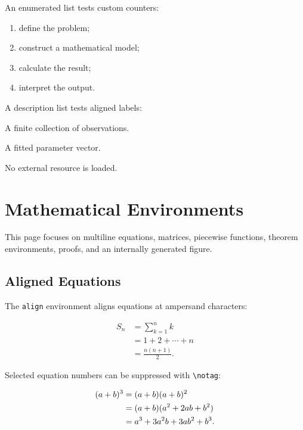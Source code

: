 \documentclass[10pt,a4paper,twocolumn]{article}
\theoremstyle{definition}
\theoremstyle{remark}
\begin{document}
An enumerated list tests custom counters:

\begin{enumerate}[label=(\roman*)]
  \item define the problem;
  \item construct a mathematical model;
  \item calculate the result;
  \item interpret the output.
\end{enumerate}

A description list tests aligned labels:

\begin{description}[style=nextline]
  \item[Input] A finite collection of observations.
  \item[Output] A fitted parameter vector.
  \item[Constraint] No external resource is loaded.
\end{description}

\newpage


\section{Mathematical Environments}

This page focuses on multiline equations, matrices, piecewise
functions, theorem environments, proofs, and an internally generated
figure.

\subsection{Aligned Equations}

The \texttt{align} environment aligns equations at ampersand
characters:

\begin{align}
  S_n
    &= \sum_{k=1}^{n} k \\
    &= 1+2+\cdots+n \\
    &= \frac{n(n+1)}{2}.
\end{align}

Selected equation numbers can be suppressed with
\verb|\notag|:

\begin{align}
  (a+b)^3
    &= (a+b)(a+b)^2 \notag\\
    &= (a+b)(a^2+2ab+b^2) \notag\\
    &= a^3+3a^2b+3ab^2+b^3.
\end{align}
\end{document}
